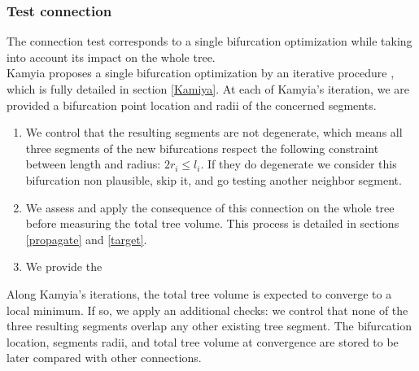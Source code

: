 \documentclass[a4paper, 11pt]{article} %
\begin{document}
\subsubsection{Test connection}

The connection test corresponds to a single bifurcation optimization while taking into account its impact on the whole tree.\\

Kamyia proposes a single bifurcation optimization by an iterative procedure \cite{kamiya1972optimal}, which is fully detailed in section \ref{Kamiya}. 
At each of Kamyia's iteration, we are provided a bifurcation point location and radii of the concerned segments. 
\begin{enumerate}
\item  We control that the resulting segments are not degenerate, which means all three segments of the new bifurcations respect the following constraint between length and radius: $2r_i \leq l_i$. If they do degenerate we consider this bifurcation non plausible, skip it, and go testing another neighbor segment.

\item We assess and apply the consequence of this connection on the whole tree before measuring the total tree volume. This process is detailed in sections \ref{propagate} and \ref{target}.

\item We provide the 
\end{enumerate}


Along Kamyia's iterations, the total tree volume is expected to converge to a local minimum. 
If so, we apply an additional checks: we control that none of the three resulting segments overlap any other existing tree segment.
The bifurcation location, segments radii, and total tree volume at convergence are stored to be later compared with other connections.



%
%
\end{document}
